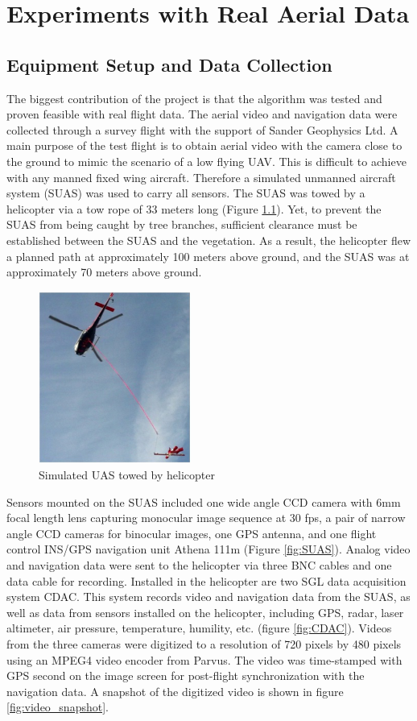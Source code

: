 \chapter{Experiments with Real Aerial Data}
\section{Equipment Setup and Data Collection}
The biggest contribution of the project is that the algorithm was
tested and proven feasible with real flight data. The aerial video and
navigation data were collected through a survey flight with the
support of Sander Geophysics Ltd. A main purpose of the test flight is
to obtain aerial video with the camera close to the ground
to mimic the scenario of a low flying UAV. This is difficult to
achieve with any manned fixed wing aircraft. Therefore a simulated
unmanned aircraft system (SUAS) was used to carry all sensors. The
SUAS was towed by a helicopter via a tow rope of 33 meters long
(Figure \ref{fig:towedSUAS}). Yet, to prevent
the SUAS from being caught by tree branches, sufficient clearance must be
established between the SUAS and the vegetation. As a result, the helicopter
flew a planned path at approximately 100 meters above ground, and the SUAS
was at approximately 70 meters above ground.

\begin{figure}[h]
\centering
\includegraphics[width=5cm,keepaspectratio=true]{./Figures/towed_SUAS.jpg}
\caption{Simulated UAS towed by helicopter}
\label{fig:towedSUAS}
\end{figure}
\FloatBarrier

Sensors mounted on the SUAS included one wide angle CCD camera with
6mm focal length lens capturing monocular image sequence at 30 fps, a
pair of narrow angle CCD cameras for binocular images, one GPS
antenna, and one flight control INS/GPS navigation unit Athena 111m
\cite{_athena_????} (Figure \ref{fig:SUAS}). Analog video and
navigation data were sent to the helicopter via three BNC cables and
one data cable for recording. Installed in the helicopter are two SGL
data acquisition system CDAC. This system records video and navigation
data from the SUAS, as well as data from sensors installed on the
helicopter, including GPS, radar, laser altimeter, air pressure,
temperature, humility, etc. (figure \ref{fig:CDAC}). Videos from the
three cameras were digitized to a resolution of 720 pixels by 480
pixels using an MPEG4 video encoder from Parvus. The video was
time-stamped with GPS second on the image screen for post-flight
synchronization with the navigation data. A snapshot of the digitized
video is shown in figure \ref{fig:video_snapshot}.

